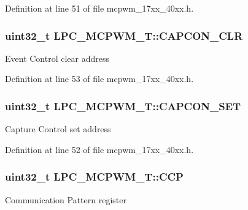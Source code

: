 Definition at line 51 of file mcpwm\+\_\+17xx\+\_\+40xx.\+h.

\subsubsection[{\texorpdfstring{C\+A\+P\+C\+O\+N\+\_\+\+C\+LR}{CAPCON_CLR}}]{ uint32\+\_\+t L\+P\+C\+\_\+\+M\+C\+P\+W\+M\+\_\+\+T\+::\+C\+A\+P\+C\+O\+N\+\_\+\+C\+LR}\hypertarget{structLPC__MCPWM__T_aadd69d706d636d53ff8893d3a0be210a}{}\label{structLPC__MCPWM__T_aadd69d706d636d53ff8893d3a0be210a}
Event Control clear address 

Definition at line 53 of file mcpwm\+\_\+17xx\+\_\+40xx.\+h.

\subsubsection[{\texorpdfstring{C\+A\+P\+C\+O\+N\+\_\+\+S\+ET}{CAPCON_SET}}]{ uint32\+\_\+t L\+P\+C\+\_\+\+M\+C\+P\+W\+M\+\_\+\+T\+::\+C\+A\+P\+C\+O\+N\+\_\+\+S\+ET}\hypertarget{structLPC__MCPWM__T_a8511a69d57549e1765080274f4bd5c3c}{}\label{structLPC__MCPWM__T_a8511a69d57549e1765080274f4bd5c3c}
Capture Control set address 

Definition at line 52 of file mcpwm\+\_\+17xx\+\_\+40xx.\+h.

\subsubsection[{\texorpdfstring{C\+CP}{CCP}}]{ uint32\+\_\+t L\+P\+C\+\_\+\+M\+C\+P\+W\+M\+\_\+\+T\+::\+C\+CP}\hypertarget{structLPC__MCPWM__T_a8b75fa73064dfd26c78d2a4bfe5ff01a}{}\label{structLPC__MCPWM__T_a8b75fa73064dfd26c78d2a4bfe5ff01a}
Communication Pattern register 

